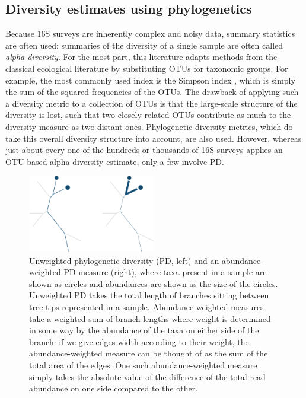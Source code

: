 \documentclass{amsart}
\newcommand{\forarxiv}[1]{#1}
\begin{document}
\subsection{Diversity estimates using phylogenetics}

Because 16S surveys are inherently complex and noisy data, summary statistics are often used; summaries of the diversity of a single sample are often called \emph{alpha diversity}.
For the most part, this literature adapts methods from the classical ecological literature by substituting OTUs for taxonomic groups.
For example, the most commonly used index is the Simpson index \citep{simpson1949measurement}, which is simply the sum of the squared frequencies of the OTUs.
The drawback of applying such a diversity metric to a collection of OTUs is that the large-scale structure of the diversity is lost, such that two closely related OTUs contribute as much to the diversity measure as two distant ones.
Phylogenetic diversity metrics, which do take this overall diversity structure into account, are also used.
However, whereas just about every one of the hundreds or thousands of 16S surveys applies an OTU-based alpha diversity estimate, only a few involve PD.

\newcommand{\pdLegend}{
    Unweighted phylogenetic diversity (PD, left) and an abundance-weighted PD measure (right), where taxa present in a sample are shown as circles and abundances are shown as the size of the circles.
    Unweighted PD takes the total length of branches sitting between tree tips represented in a sample.
    Abundance-weighted measures take a weighted sum of branch lengths where weight is determined in some way by the abundance of the taxa on either side of the branch: if we give edges width according to their weight, the abundance-weighted measure can be thought of as the sum of the total area of the edges.
    One such abundance-weighted measure simply takes the absolute value of the difference of the total read abundance on one side compared to the other.
}
\forarxiv{
\begin{figure}
  \begin{center}
    \includegraphics[width=2.2in]{figures/pd.pdf}
  \end{center}
  \vspace{-10pt}
  \caption{\pdLegend}
  \label{fig:pd}
\end{figure}
}
\end{document}
